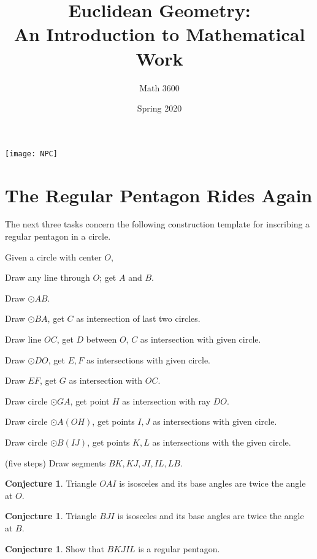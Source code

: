 \documentclass{tufte-handout}
\title{Euclidean Geometry:\\An Introduction to Mathematical Work}
\author[]{Math 3600}
\date{Spring 2020}
\theoremstyle{definition}
\newtheorem{conjecture}[problem]{Conjecture}
\begin{document}
\maketitle

\begin{marginfigure}
    \texttt{[image: NPC]}
\end{marginfigure}

\setcounter{section}{16}
\section{The Regular Pentagon Rides Again}


The next three tasks concern the following construction template for inscribing a regular pentagon in a circle. 

\vspace{.5in}

Given a circle with center $O$,
\begin{compactenum}
\item Draw any line through $O$; get $A$ and $B$.
\item Draw $\odot AB$.
\item Draw $\odot BA$, get $C$ as intersection of last two circles.
\item Draw line $OC$, get $D$ between $O$, $C$ as intersection with given circle.
\item Draw $\odot DO$, get $E, F$ as intersections with given circle.
\item Draw $EF$, get $G$ as intersection with $OC$.
\item Draw circle $\odot GA$, get point $H$ as intersection with ray $DO$.
\item Draw circle $\odot A(OH)$, get points $I, J$ as intersections with given circle.
\item Draw circle $\odot B(IJ)$, get points $K, L$ as intersections with the given circle.
\item (five steps) Draw segments $BK, KJ, JI, IL, LB$.
\end{compactenum}

\vspace{.5in}

\begin{conjecture}\label{conj:pentagon-1}
Triangle $OAI$ is isosceles and its base angles are twice the angle at $O$.
\end{conjecture}

\begin{conjecture}\label{conj:pentagon-2}
Triangle $BJI$ is isosceles and its base angles are twice the angle at $B$.
\end{conjecture}

\begin{conjecture}\label{conj:pentagon-3}
Show that $BKJIL$ is a regular pentagon.
\end{conjecture}

\vfill
\end{document}
